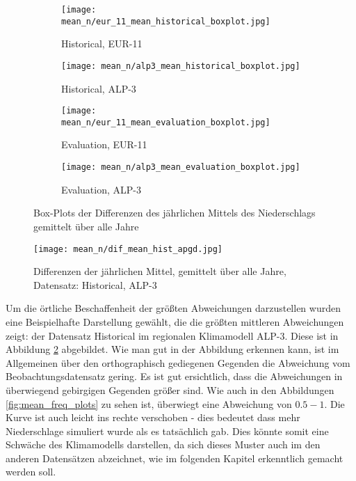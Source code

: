 \begin{figure}[h!]
	\begin{subfigure}{0.49\textwidth}
		\texttt{[image: mean\_n/eur\_11\_mean\_historical\_boxplot.jpg]}
		\caption{Historical, EUR-11}
	\end{subfigure}
	\begin{subfigure}{0.49\textwidth}
		\texttt{[image: mean\_n/alp3\_mean\_historical\_boxplot.jpg]}
		\caption{Historical, ALP-3}
	\end{subfigure}
	\begin{subfigure}{0.49\textwidth}
		\texttt{[image: mean\_n/eur\_11\_mean\_evaluation\_boxplot.jpg]}
		\caption{Evaluation, EUR-11}
	\end{subfigure}
	\begin{subfigure}{0.49\textwidth}
		\texttt{[image: mean\_n/alp3\_mean\_evaluation\_boxplot.jpg]}
		\caption{Evaluation, ALP-3}
	\end{subfigure}
	\caption{Box-Plots der Differenzen des jährlichen Mittels des Niederschlags gemittelt über alle Jahre}
	\label{fig:mean_boxplots}
\end{figure}
\begin{figure}[h]
	\texttt{[image: mean\_n/dif\_mean\_hist\_apgd.jpg]}
    \caption{Differenzen der jährlichen Mittel, gemittelt über alle Jahre, Datensatz: Historical, ALP-3}
    \label{fig:alp3_dif_hist_mean}
\end{figure}
Um die örtliche Beschaffenheit der größten Abweichungen darzustellen wurden eine Beispielhafte Darstellung gewählt, die die größten mittleren Abweichungen zeigt: der Datensatz Historical im regionalen Klimamodell ALP-3. Diese ist in Abbildung \ref{fig:alp3_dif_hist_mean} abgebildet.
Wie man gut in der Abbildung erkennen kann, ist im Allgemeinen über den orthographisch gediegenen Gegenden die Abweichung vom Beobachtungsdatensatz gering. Es ist gut ersichtlich, dass die Abweichungen in überwiegend gebirgigen Gegenden größer sind. Wie auch in den Abbildungen \ref{fig:mean_freq_plots} zu sehen ist, überwiegt eine Abweichung von $0.5-1$. Die Kurve ist auch leicht ins rechte verschoben - dies bedeutet dass mehr Niederschlage simuliert wurde als es tatsächlich gab. Dies könnte somit eine Schwäche des Klimamodells darstellen, da sich dieses Muster auch im den anderen Datensätzen abzeichnet, wie im folgenden Kapitel erkenntlich gemacht werden soll. \newpage

